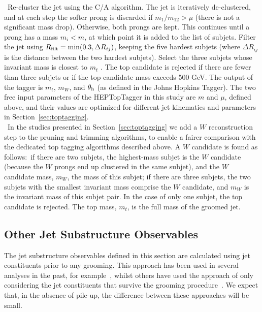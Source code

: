 ~Re-cluster the jet using the C/A algorithm. The jet is iteratively de-clustered, and at each step the softer prong is discarded if $m_1/m_{12}>\mu$ (there is not a significant mass drop). Otherwise, both prongs are kept. This continues until a prong has a mass $m_i < m$, at which point it is added to the list of subjets. Filter the jet using $R_{\rm filt}=\mathrm{min}(0.3,\Delta R_{ij})$, keeping the five hardest subjets (where $\Delta R_{ij}$ is the distance between the two hardest subjets). Select the three subjets whose invariant mass is closest to $m_t$ \cite{Plehn:2010st}. The top candidate is rejected if there are fewer than three subjets or if the top candidate mass exceeds 500 GeV. The output of the tagger is $m_t$, $m_W$, and $\theta_{\rm h}$ (as defined in the Johns Hopkins Tagger). The two free input parameters of the HEPTopTagger in this study are $m$ and $\mu$, defined above, and their values are optimized for different jet kinematics and parameters in Section~\ref{sec:toptagging}.\\

~In the studies presented in Section~\ref{sec:toptagging} we add a $W$ reconstruction step to the pruning and trimming algorithms, to enable a fairer comparison with the dedicated top tagging algorithms described above. A $W$ candidate is found as follows:~if there are two subjets, the highest-mass subjet is the $W$ candidate (because the $W$ prongs end up clustered in the same subjet), and the $W$ candidate mass, $m_W$, the mass of this subjet; if there are three subjets, the two subjets with the smallest invariant mass comprise the $W$ candidate, and $m_W$ is the invariant mass of this subjet pair. In the case of only one subjet, the top candidate is rejected. The top mass, $m_t$, is the full mass of the groomed jet.\\


\subsection{Other Jet Substructure Observables} \label{sec:substructure}

The jet substructure observables defined in this section are calculated using jet constituents prior to any grooming. This approach has been used in several analyses in the past, for example~\cite{Khachatryan:2014hpa, Aad:2014haa}, whilst others have used the approach of only considering the jet constituents that survive the grooming procedure~\cite{ATL-PHYS-PUB-2014-004}. We expect that, in the absence of pile-up, the difference between these approaches will be small.\\


